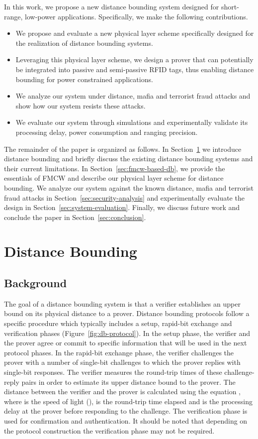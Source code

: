\documentclass{sig-alternate-10pt}
\begin{document}
In this work, we propose a new distance bounding system designed for
short-range, low-power applications. Specifically, we make the following
contributions.
\begin{itemize}
\item We propose and evaluate a new physical layer sche\-me specifically designed
  for the realization of distance bounding systems.
\item Leveraging this physical layer scheme, we design a prover that can
  potentially be integrated into passive and semi-passive RFID tags, thus
  enabling distance bounding for power constrained applications.
\item We analyze our system under distance, mafia and terrorist fraud attacks
  and show how our system resists these attacks.
\item We evaluate our system through simulations and experimentally validate its
  processing delay, power consumption and ranging precision.
\end{itemize}

The remainder of the paper is organized as follows. In
Section~\ref{sec:db-background} we introduce distance bounding and briefly
discuss the existing distance bounding systems and their current limitations. In
Section~\ref{sec:fmcw-based-db}, we provide the essentials of FMCW and describe
our physical layer scheme for distance bounding. We analyze our system against
the known distance, mafia and terrorist fraud attacks in
Section~\ref{sec:security-analysis} and experimentally evaluate the design in
Section~\ref{sec:system-evaluation}. Finally, we discuss future work and
conclude the paper in Section~\ref{sec:conclusion}.

\section{Distance Bounding}
\label{sec:db-background}

\subsection{Background}
The goal of a distance bounding system is that a verifier establishes an upper
bound on its physical distance to a prover. Distance bounding protocols follow a
specific procedure which typically includes a setup, rapid-bit exchange and
verification phases (Figure~\ref{fig:db-protocol}). In the setup phase, the
verifier and the prover agree or commit to specific information that will be
used in the next protocol phases. In the rapid-bit exchange phase, the verifier
challenges the prover with a number of single-bit challenges to which the prover
replies with single-bit responses. The verifier measures the round-trip times of
these challenge-reply pairs in order to estimate its upper distance bound to the
prover. The distance  between the verifier and the prover is calculated using
the equation , where  is the speed of light
(),  is the round-trip time elapsed and  is the
processing delay at the prover before responding to the challenge. The
verification phase is used for confirmation and authentication. It should be
noted that depending on the protocol construction the verification phase may not
be required.
\end{document}
